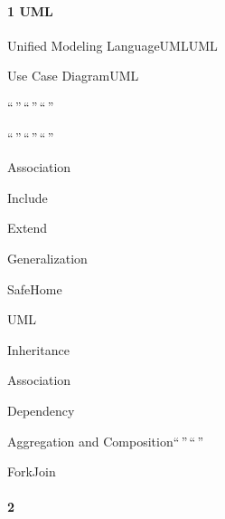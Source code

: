\hypertarget{uml}{%
\paragraph{1 UML}\label{uml}}

Unified Modeling LanguageUMLUML


Use Case DiagramUML

\important{}``\,''\,``\,''\,``\,''

\important{}``\,''\,``\,''\,``\,''

\important{}

Association

Include

Extend

Generalization

SafeHome


UML

\important{}

\important{}

Inheritance

Association

Dependency

Aggregation and Composition``\,''\,``\,''




ForkJoin









\important{}





\important{}

\hypertarget{section-9}{%
\paragraph{2}\label{section-9}}

